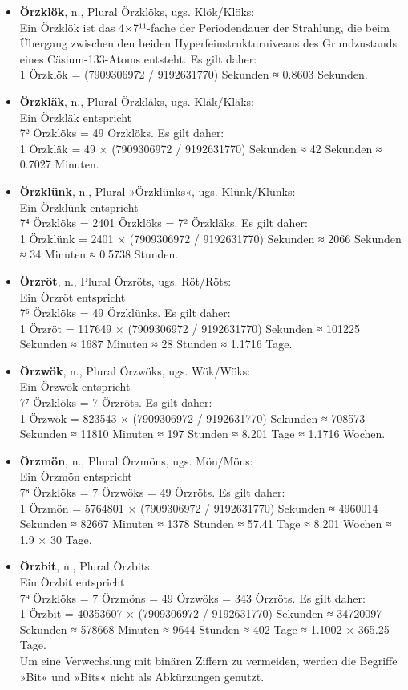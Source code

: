 \begin{itemize}
    \item \textbf{Örzklök}, n., Plural Örzklöks, ugs. Klök/Klöks:\\ Ein Örzklök ist das 4×7¹¹-fache der Periodendauer der Strahlung, die beim Übergang zwischen den beiden Hyperfeinstrukturniveaus des Grundzustands eines Cäsium-133-Atoms entsteht. Es gilt daher:\\ 1 Örzklök = (7909306972 / 9192631770) Sekunden ≈ 0.8603 Sekunden.
    \item \textbf{Örzkläk}, n., Plural Örzkläks, ugs. Kläk/Kläks:\\ Ein Örzkläk entspricht\\ 7² Örzklöks = 49 Örzklöks. Es gilt daher:\\ 1 Örzkläk = 49 × (7909306972 / 9192631770) Sekunden ≈ 42 Sekunden ≈ 0.7027 Minuten.
    \item \textbf{Örzklünk}, n., Plural »Örzklünks«, ugs. Klünk/Klünks:\\ Ein Örzklünk entspricht\\ 7⁴ Örzklöks = 2401 Örzklöks = 7² Örzkläks. Es gilt daher:\\ 1 Örzklünk = 2401 × (7909306972 / 9192631770) Sekunden ≈ 2066 Sekunden ≈ 34 Minuten ≈ 0.5738 Stunden.
    \item \textbf{Örzröt}, n., Plural Örzröts, ugs. Röt/Röts:\\ Ein Örzröt entspricht\\ 7⁶ Örzklöks = 49 Örzklünks. Es gilt daher:\\ 1 Örzröt = 117649 × (7909306972 / 9192631770) Sekunden ≈ 101225 Sekunden ≈ 1687 Minuten ≈ 28 Stunden ≈ 1.1716 Tage.
    \item \textbf{Örzwök}, n., Plural Örzwöks, ugs. Wök/Wöks:\\ Ein Örzwök entspricht\\ 7⁷ Örzklöks = 7 Örzröts. Es gilt daher:\\ 1 Örzwök = 823543 × (7909306972 / 9192631770) Sekunden ≈ 708573 Sekunden ≈ 11810 Minuten ≈ 197 Stunden ≈ 8.201 Tage ≈ 1.1716 Wochen.
    \item \textbf{Örzmön}, n., Plural Örzmöns, ugs. Mön/Möns:\\ Ein Örzmön entspricht\\ 7⁸ Örzklöks = 7 Örzwöks = 49 Örzröts. Es gilt daher:\\ 1 Örzmön = 5764801 × (7909306972 / 9192631770) Sekunden ≈ 4960014 Sekunden ≈ 82667 Minuten ≈ 1378 Stunden ≈ 57.41 Tage ≈ 8.201 Wochen ≈ 1.9 × 30 Tage.
    \item \textbf{Örzbit}, n., Plural Örzbits:\\ Ein Örzbit entspricht\\ 7⁹ Örzklöks = 7 Örzmöns = 49 Örzwöks = 343 Örzröts. Es gilt daher:\\ 1 Örzbit = 40353607 × (7909306972 / 9192631770) Sekunden ≈ 34720097 Sekunden ≈ 578668 Minuten ≈ 9644 Stunden ≈ 402 Tage ≈ 1.1002 × 365.25 Tage.\\ Um eine Verwechslung mit binären Ziffern zu vermeiden, werden die Begriffe »Bit« und »Bits« nicht als Abkürzungen genutzt.
\end{itemize}

